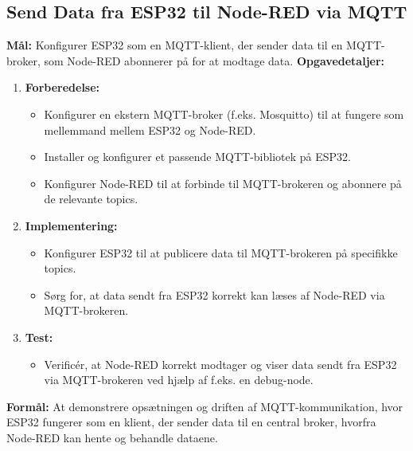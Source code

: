 \documentclass[12pt,a4paper]{book}
\begin{document}
	\subsection*{Send Data fra ESP32 til Node-RED via MQTT}
	\textbf{Mål:} Konfigurer ESP32 som en MQTT-klient, der sender data til en MQTT-broker, som Node-RED abonnerer på for at modtage data.
	\newline\newline\noindent
	\textbf{Opgavedetaljer:}
	\begin{enumerate}
		\item \textbf{Forberedelse:}
		\begin{itemize}
			\item Konfigurer en ekstern MQTT-broker (f.eks. Mosquitto) til at fungere som mellemmand mellem ESP32 og Node-RED.
			\item Installer og konfigurer et passende MQTT-bibliotek på ESP32.
			\item Konfigurer Node-RED til at forbinde til MQTT-brokeren og abonnere på de relevante topics.
		\end{itemize}
		\item \textbf{Implementering:}
		\begin{itemize}
			\item Konfigurer ESP32 til at publicere data til MQTT-brokeren på specifikke topics.
			\item Sørg for, at data sendt fra ESP32 korrekt kan læses af Node-RED via MQTT-brokeren.
		\end{itemize}
		\item \textbf{Test:}
		\begin{itemize}
			\item Verificér, at Node-RED korrekt modtager og viser data sendt fra ESP32 via MQTT-brokeren ved hjælp af f.eks. en debug-node.
		\end{itemize}
	\end{enumerate}
	\textbf{Formål:} At demonstrere opsætningen og driften af MQTT-kommunikation, hvor ESP32 fungerer som en klient, der sender data til en central broker, hvorfra Node-RED kan hente og behandle dataene.
	
\end{document}
